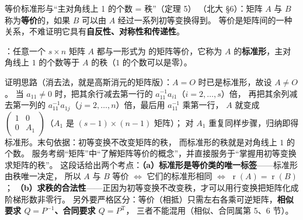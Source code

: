 \begin{fdeep}{等价标准形与“主对角线上 1 的个数 = 秩”（定理 5）}
（北大 §6）：矩阵 $A$ 与 $B$ 称为\textbf{等价}的，如果 $B$ 可以由 $A$ 经过一系列初等变换得到。
等价是矩阵间的一种关系，不难证明它具有\textbf{自反性、对称性和传递性}。

：任意一个 $s\times n$ 矩阵 $A$ 都与一形式为
的矩阵等价，它称为 $A$ 的\textbf{标准形}，主对角线上 $1$ 的个数等于 $A$ 的秩（$1$ 的个数可以是零）。

证明思路（消去法，就是高斯消元的矩阵版）：$A=O$ 时已是标准形，故设 $A\ne O$。
当 $a_{11}\ne0$ 时，把其余行减去第一行的 $a_{11}^{-1}a_{i1}$（$i=2,\dots,s$）倍，
再把其余列减去第一列的 $a_{11}^{-1}a_{1j}$（$j=2,\dots,n$）倍，最后用 $a_{11}^{-1}$ 乘第一行，
$A$ 就变成 $\begin{pmatrix}1&0\\0&A_1\end{pmatrix}$（$A_1$ 是 $(s-1)\times(n-1)$ 矩阵）；
对 $A_1$ 重复同样步骤，归纳即得标准形。末句依据：初等变换不改变矩阵的秩，
而标准形的秩就是对角线上 $1$ 的个数。
\fbref{}服务考纲“矩阵”中“了解矩阵等价的概念”，并直接服务于“掌握用初等变换求矩阵的秩”。
这段话给出两个考点：\textbf{（a）标准形是等价类的唯一标签}——标准形由秩唯一决定，
所以 $A$ 与 $B$ 等价 $\iff$ 它们的标准形相同 $\iff$ $\operatorname{r}(A)=\operatorname{r}(B)$；
\textbf{（b）求秩的合法性}——正因为初等变换不改变秩，才可以用行变换把矩阵化成阶梯形数非零行。
另外要严格区分：等价（相抵）只需左右各乘可逆矩阵，\textbf{相似要求 $Q=P^{-1}$、合同要求 $Q=P^{\mathrm{T}}$}，
三者不能混用（相似、合同属第 5、6 节）。
\end{fdeep}

